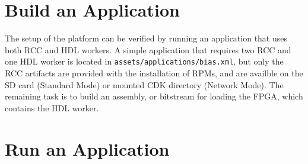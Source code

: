 \section{Build an Application}
\begin{flushleft}
The setup of the platform can be verified by running an application that uses both RCC and HDL workers. A simple application that requires two RCC and one HDL worker is located in \texttt{assets/applications/bias.xml}, but only the RCC artifacts are provided with the installation of RPMs, and are availble on the SD card (Standard Mode) or mounted CDK directory (Network Mode). The remaining task is to build an assembly, or bitstream for loading the FPGA, which contains the HDL worker.
\end{flushleft}

\section{Run an Application}
